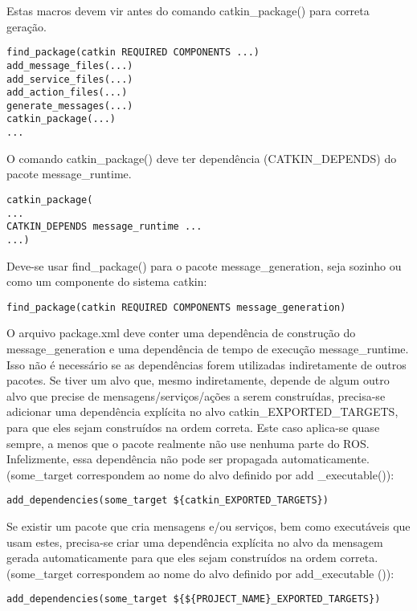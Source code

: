 Estas macros devem vir antes do comando catkin\_package() para correta geração.

\begin{verbatim}
find_package(catkin REQUIRED COMPONENTS ...)
add_message_files(...)
add_service_files(...)
add_action_files(...)
generate_messages(...)
catkin_package(...)
...
\end{verbatim}

O comando catkin\_package() deve ter dependência (CATKIN\_DEPENDS) do pacote message\_runtime.

\begin{verbatim}
catkin_package(
...
CATKIN_DEPENDS message_runtime ...
...)
\end{verbatim}

Deve-se usar find\_package() para o pacote message\_generation, seja sozinho ou como um componente do sistema catkin:

\begin{verbatim}
find_package(catkin REQUIRED COMPONENTS message_generation)
\end{verbatim}

O arquivo package.xml deve conter uma dependência de construção do message\_generation e uma dependência de tempo de execução message\_runtime. Isso não é necessário se as dependências forem utilizadas indiretamente de outros pacotes.
Se tiver um alvo que, mesmo indiretamente, depende de algum outro alvo que precise de mensagens/serviços/ações a serem construídas, precisa-se adicionar uma dependência explícita no alvo catkin\_EXPORTED\_TARGETS, para que eles sejam construídos na ordem correta. Este caso aplica-se quase sempre, a menos que o pacote realmente não use nenhuma parte do ROS. Infelizmente, essa dependência não pode ser propagada automaticamente. (some\_target correspondem ao nome do alvo definido por add \_executable()):

\begin{verbatim}
add_dependencies(some_target ${catkin_EXPORTED_TARGETS})
\end{verbatim}

Se existir um pacote que cria mensagens e/ou serviços, bem como executáveis que usam estes, precisa-se criar uma dependência explícita no alvo da mensagem gerada automaticamente para que eles sejam construídos na ordem correta. (some\_target correspondem ao nome do alvo definido por add\_executable ()):

\begin{verbatim}
add_dependencies(some_target ${${PROJECT_NAME}_EXPORTED_TARGETS})
\end{verbatim}

